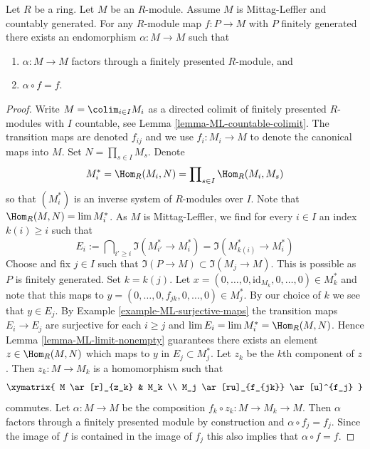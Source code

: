 \begin{lemma}
\label{lemma-ML-countable}
Let $R$ be a ring.
Let $M$ be an $R$-module.
Assume $M$ is Mittag-Leffler and countably generated.
For any $R$-module map $f : P \to M$ with $P$ finitely generated there
exists an endomorphism $\alpha : M \to M$ such that
\begin{enumerate}
\item $\alpha : M \to M$ factors through a finitely presented $R$-module, and
\item $\alpha \circ f = f$.
\end{enumerate}
\end{lemma}

\begin{proof}
Write $M = \colim_{i \in I} M_i$ as a directed colimit of finitely
presented $R$-modules with $I$ countable, see
Lemma \ref{lemma-ML-countable-colimit}.
The transition maps are denoted $f_{ij}$ and we use $f_i : M_i \to M$
to denote the canonical maps into $M$. Set $N = \prod_{s \in I} M_s$. Denote
$$
M_i^* = \Hom_R(M_i, N) = \prod\nolimits_{s \in I} \Hom_R(M_i, M_s)
$$
so that $(M_i^*)$ is an inverse system of $R$-modules over $I$.
Note that $\Hom_R(M, N) = \lim M_i^*$.
As $M$ is Mittag-Leffler, we find for every
$i \in I$ an index $k(i) \geq i$ such that
$$
E_i := \bigcap\nolimits_{i' \geq i} \Im(M_{i'}^* \to M_i^*)
=
\Im(M_{k(i)}^* \to M_i^*)
$$
Choose and fix $j \in I$ such that $\Im(P \to M) \subset \Im(M_j \to M)$.
This is possible as $P$ is finitely generated. Set $k = k(j)$.
Let
$x = (0, \ldots, 0, \text{id}_{M_k}, 0, \ldots, 0) \in M_k^*$ and
note that this maps to $y = (0, \ldots, 0, f_{jk}, 0, \ldots, 0) \in M_j^*$.
By our choice of $k$ we see that $y \in E_j$. By
Example \ref{example-ML-surjective-maps}
the transition maps $E_i \to E_j$ are surjective for each $i \geq j$
and $\lim E_i = \lim M_i^* = \Hom_R(M, N)$. Hence
Lemma \ref{lemma-ML-limit-nonempty}
guarantees there exists an element $z \in \Hom_R(M, N)$
which maps to $y$ in $E_j \subset M_j^*$. Let $z_k$ be the $k$th component
of $z$. Then $z_k : M \to M_k$ is a homomorphism such that
$$
\xymatrix{
M \ar[r]_{z_k} & M_k \\
M_j \ar[ru]_{f_{jk}} \ar[u]^{f_j}
}
$$
commutes. Let $\alpha : M \to M$ be the composition
$f_k \circ z_k : M \to M_k \to M$.
Then $\alpha$ factors through a finitely presented module by construction and
$\alpha \circ f_j = f_j$. Since the image of $f$ is contained in the image of
$f_j$ this also implies that $\alpha \circ f = f$.
\end{proof}
